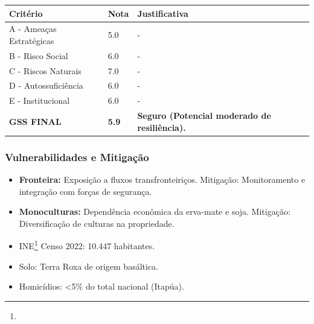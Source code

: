 \begin{table}[ht!]
\small \begin{tabular}{p{3.0cm}p{0.8cm}p{6.0cm}} \toprule
\textbf{Critério} & \textbf{Nota} & \textbf{Justificativa} \\ \midrule
A - Ameaças Estratégicas & 5.0 & - \\
B - Risco Social & 6.0 & - \\
C - Riscos Naturais & 7.0 & - \\
D - Autossuficiência & 6.0 & - \\
E - Institucional & 6.0 & - \\
\midrule \textbf{GSS FINAL} & \textbf{5.9} & \textbf{Seguro (Potencial moderado de resiliência).} \\ \bottomrule \end{tabular}
\end{table}
\subsubsection{Vulnerabilidades e
Mitigação}

\begin{itemize}
\item
  \textbf{Fronteira:} Exposição a fluxos transfronteiriços. Mitigação:
  Monitoramento e integração com forças de segurança.
\item
  \textbf{Monoculturas:} Dependência econômica da erva-mate e soja.
  Mitigação: Diversificação de culturas na propriedade.
\item
  INE\footnote{\fineINE} Censo 2022: 10.447 habitantes.
\item
  Solo: Terra Roxa de origem basáltica.
\item
  Homicídios: \textless5\% do total nacional (Itapúa).
\end{itemize}
